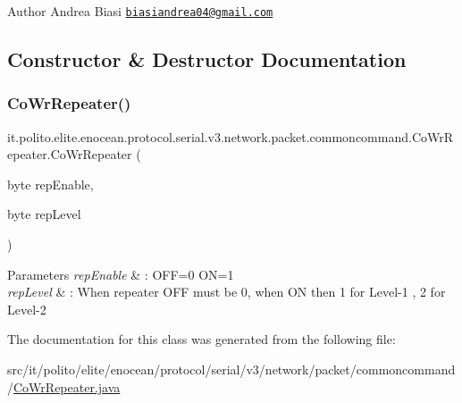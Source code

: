 \begin{DoxyAuthor}{Author}
Andrea Biasi \href{mailto:biasiandrea04@gmail.com}{\tt biasiandrea04@gmail.\+com} 
\end{DoxyAuthor}


\subsection{Constructor \& Destructor Documentation}
\hypertarget{classit_1_1polito_1_1elite_1_1enocean_1_1protocol_1_1serial_1_1v3_1_1network_1_1packet_1_1commoncommand_1_1_co_wr_repeater_a3ca7952e552b41ef03cf877ad71513a4}{}\label{classit_1_1polito_1_1elite_1_1enocean_1_1protocol_1_1serial_1_1v3_1_1network_1_1packet_1_1commoncommand_1_1_co_wr_repeater_a3ca7952e552b41ef03cf877ad71513a4} 
\subsubsection{\texorpdfstring{Co\+Wr\+Repeater()}{CoWrRepeater()}}
{\footnotesize\ttfamily it.\+polito.\+elite.\+enocean.\+protocol.\+serial.\+v3.\+network.\+packet.\+commoncommand.\+Co\+Wr\+Repeater.\+Co\+Wr\+Repeater (\begin{DoxyParamCaption}\item[{byte}]{rep\+Enable,  }\item[{byte}]{rep\+Level }\end{DoxyParamCaption})}


\begin{DoxyParams}{Parameters}
{\em rep\+Enable} & \+: O\+FF=0 ON=1 \\
\hline
{\em rep\+Level} & \+: When repeater O\+FF must be 0, when ON then 1 for Level-\/1 , 2 for Level-\/2 \\
\hline
\end{DoxyParams}


The documentation for this class was generated from the following file\+:\begin{DoxyCompactItemize}
\item 
src/it/polito/elite/enocean/protocol/serial/v3/network/packet/commoncommand/\hyperlink{_co_wr_repeater_8java}{Co\+Wr\+Repeater.\+java}\end{DoxyCompactItemize}
